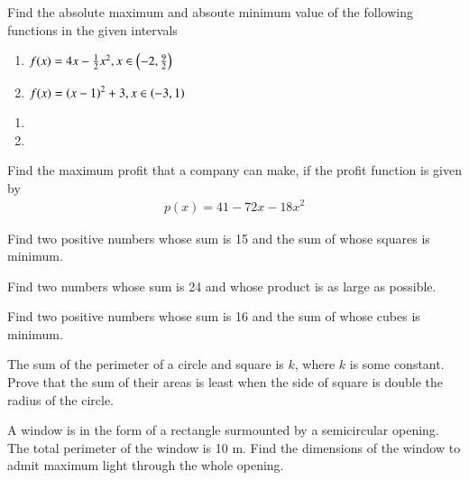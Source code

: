 %

\item Find the absolute maximum and absoute minimum value of the following functions in the given intervals
%
\begin{enumerate}
\item $f(x) = 4x - \frac{1}{2}x^2, x \in \left(-2,\frac{9}{2}\right)$
\item $f(x) = \left(x-1\right)^2 + 3,  x \in \left(-3,1\right)$
\end{enumerate}
%
\solution
\begin{enumerate}
    \item  
    \item  

\end{enumerate}
\item Find the maximum profit that a company can make, if the profit function is given by
\begin{align}
p(x) = 41-72x - 18x^2
\end{align}
%
\solution

\item Find two positive numbers whose sum is 15 and the sum of whose squares is minimum.
\item Find two numbers whose sum is 24 and whose product is as large as possible.
\\
\solution


\item Find two positive numbers whose sum is 16 and the sum of whose cubes is minimum.
\item The sum of the perimeter of a circle and square is $k$, where $k$ is some constant. Prove that the sum of their areas is least when the side of square is double the radius of the circle.
\item A window is in the form of a rectangle surmounted by a semicircular opening. The total perimeter of the window is 10 m. Find the dimensions of the window to admit maximum light through the whole opening.

